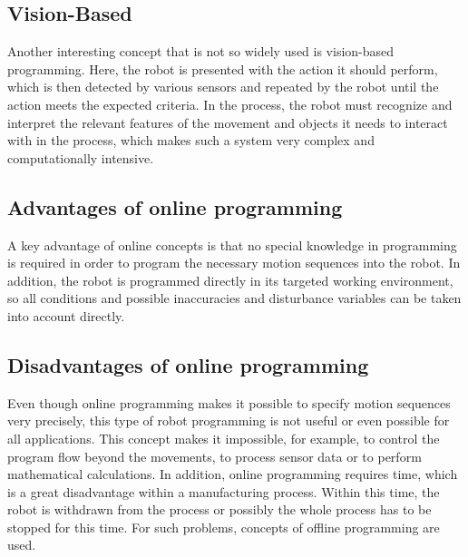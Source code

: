 \documentclass[conference]{IEEEtran}
\begin{document}
    \subsection{Vision-Based}
        Another interesting concept that is not so widely used is vision-based programming. Here, the robot is presented with the action it should perform, which is then detected by various sensors and repeated by the robot until the action meets the expected criteria. \cite[p. 178]{b5} %
        In the process, the robot must recognize and interpret the relevant features of the movement and objects it needs to interact with in the process, \cite[p. 7]{p4} %
        which makes such a system very complex and computationally intensive. \cite[p. 300]{p5} %

    \subsection{Advantages of online programming}
        A key advantage of online concepts is that no special knowledge in programming is required in order to program the necessary motion sequences into the robot. In addition, the robot is programmed directly in its targeted working environment, so all conditions and possible inaccuracies and disturbance variables can be taken into account directly. \cite[p. 92]{b6} %

    \subsection{Disadvantages of online programming}
        Even though online programming makes it possible to specify motion sequences very precisely, this type of robot programming is not useful or even possible for all applications. This concept makes it impossible, for example, to control the program flow beyond the movements, to process sensor data or to perform mathematical calculations. In addition, online programming requires time, which is a great disadvantage within a manufacturing process. Within this time, the robot is withdrawn from the process or possibly the whole process has to be stopped for this time. For such problems, concepts of offline programming are used. \cite[pp. 190-191]{b4}%

\end{document}
